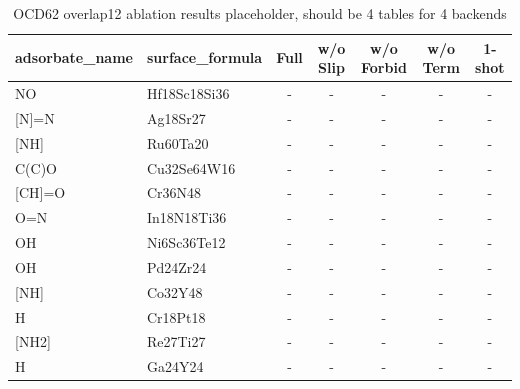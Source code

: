 \documentclass[%
 preprint,
 superscriptaddress,
 amsmath,amssymb,
 aps,
 prb,
 floatfix,
]{revtex4-2}
\begin{document}
\begin{table}[htbp]
\centering
\caption{OCD62 overlap12 ablation results placeholder, should be 4 tables for 4 backends}
\label{tab:adsorbates}
\begin{tabular}{llccccc}
\toprule
adsorbate\_name & surface\_formula &  Full & w/o Slip & w/o Forbid & w/o Term & 1-shot \\
\midrule
NO    & Hf18Sc18Si36 & - & - & - & - & -  \\
{[N]=N}  & Ag18Sr27    & - & - & - & - & -  \\
{[NH]}   & Ru60Ta20    & - & - & - & - & -  \\
C(C)O & Cu32Se64W16 & - & - & - & - & -  \\
{[CH]=O} & Cr36N48    & - & - & - & - & -  \\
O=N   & In18N18Ti36 & - & - & - & - & -  \\
OH    & Ni6Sc36Te12 & - & - & - & - & -  \\
OH    & Pd24Zr24    & - & - & - & - & -  \\
{[NH]}   & Co32Y48     & - & - & - & - & -  \\
H     & Cr18Pt18    & - & - & - & - & -  \\
{[NH2]}  & Re27Ti27    & - & - & - & - & -  \\
H     & Ga24Y24     & - & - & - & - & -  \\
\bottomrule
\end{tabular}
\end{table}
\end{document}
